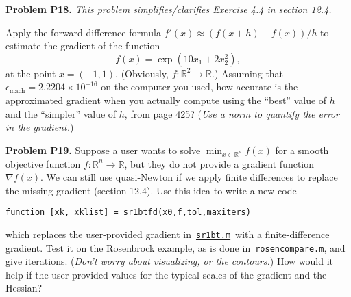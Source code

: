 \documentclass[12pt]{amsart}
\newcommand{\RR}{\mathbb{R}}
\newcommand{\eps}{\epsilon}
\newcommand{\grad}{\nabla}
\newcommand{\prob}[1]{\bigskip\noindent\textbf{#1}\quad }
\begin{document}
\medskip
\prob{Problem P18.}  \emph{This problem simplifies/clarifies Exercise 4.4 in section 12.4.}

\medskip
Apply the forward difference formula $f'(x) \approx (f(x+h)-f(x))/h$ to estimate the gradient of the function
    $$f(x) = \exp(10 x_1 + 2 x_2^2),$$
at the point $x=(-1,1)$.  (Obviously, $f:\RR^2 \to \RR$.)  Assuming that $\eps_{\text{mach}} = 2.2204 \times 10^{-16}$ on the computer you used, how accurate is the approximated gradient when you actually compute using the ``best'' value of $h$ and the ``simpler'' value of $h$, from page 425?  (\emph{Use a norm to quantify the error in the gradient.})

\medskip
\prob{Problem P19.}  Suppose a user wants to solve $\min_{x\in\RR^n} f(x)$ for a smooth objective function $f:\RR^n\to \RR$, but they do not provide a gradient function $\grad f(x)$.  We can still use quasi-Newton if we apply finite differences to replace the missing gradient (section 12.4).  Use this idea to write a new code

\medskip
\centerline{\texttt{function [xk, xklist] = sr1btfd(x0,f,tol,maxiters)}}

\medskip
\noindent which replaces the user-provided gradient in \,\href{https://bueler.github.io/opt/assets/codes/sr1bt.m}{\texttt{sr1bt.m}}\, with a finite-difference gradient.  Test it on the Rosenbrock example, as is done in \,\href{https://bueler.github.io/opt/assets/codes/rosencompare.m}{\texttt{rosencompare.m}}, and give iterations.  (\emph{Don't worry about visualizing, or the contours.})  How would it help if the user provided values for the typical scales of the gradient and the Hessian?
\end{document}
